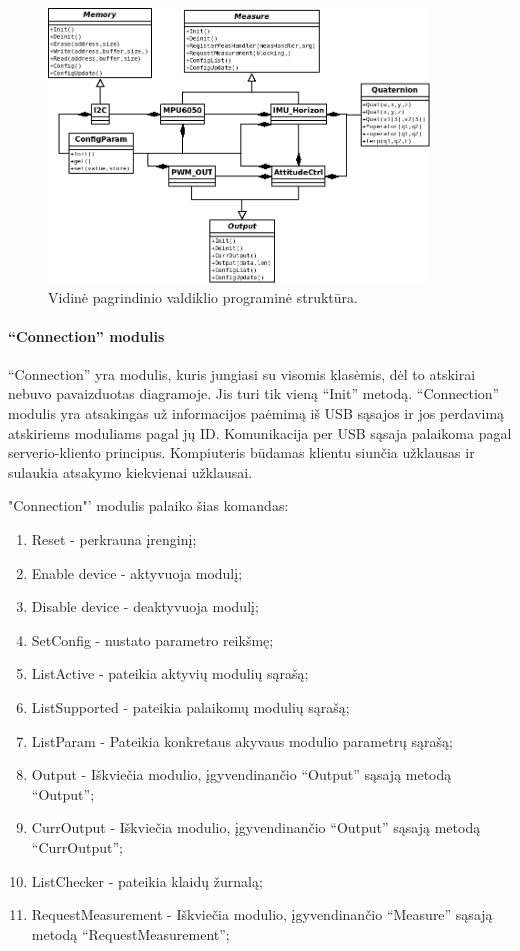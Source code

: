 \documentclass[12pt, a4paper, lithuanian, final]{article}
\begin{document}
\begin{figure}[H]
\begin{center}
\includegraphics[width=0.9\textwidth]{img/classDiagram.png}
\caption{Vidinė pagrindinio valdiklio programinė struktūra.}
\end{center}
\end{figure}


\paragraph{"`Connection"' modulis}
"`Connection"' yra modulis, kuris jungiasi su visomis klasėmis, dėl to atskirai nebuvo pavaizduotas diagramoje.
Jis turi tik vieną "`Init"' metodą.
"`Connection"' modulis yra atsakingas už informacijos paėmimą iš USB sąsajos ir jos perdavimą atskiriems moduliams pagal jų ID.
Komunikacija per USB sąsaja palaikoma pagal serverio-kliento principus.
Kompiuteris būdamas klientu siunčia užklausas ir sulaukia atsakymo kiekvienai užklausai.

"Connection"' modulis palaiko šias komandas:
\begin{enumerate}
	\item Reset - perkrauna įrenginį;
	\item Enable device - aktyvuoja modulį;
	\item Disable device - deaktyvuoja modulį;
	\item SetConfig - nustato parametro reikšmę;
	\item ListActive - pateikia aktyvių modulių sąrašą;
	\item ListSupported - pateikia palaikomų modulių sąrašą;
	\item ListParam - Pateikia konkretaus akyvaus modulio parametrų sąrašą;
	\item Output - Iškviečia modulio, įgyvendinančio "`Output"' sąsają metodą "`Output"';
	\item CurrOutput - Iškviečia modulio, įgyvendinančio "`Output"' sąsają metodą "`CurrOutput"';
	\item ListChecker - pateikia klaidų žurnalą;
	\item RequestMeasurement - Iškviečia modulio, įgyvendinančio "`Measure"' sąsają metodą "`RequestMeasurement"';
\end{enumerate}
\end{document}
